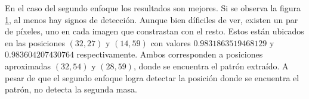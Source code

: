 \begin{figure}
	\caption{} \label{fig:example-mm-approach2}
\end{figure}

En el caso del segundo enfoque  los resultados son mejores. Si se observa la figura \ref{fig:example-mm-approach2}, al menos hay signos de detección.
Aunque bien díficiles de ver, existen un par de píxeles, uno en cada imagen que constrastan con el resto.
Estos están ubicados en las posiciones $(32,27)$ y $(14,59)$ con valores $0.9831863519468129$ y $0.983604207430764$
respectivamente. Ambos corresponden a posiciones aproximadas $(32,54)$ y $(28,59)$, donde se encuentra el patrón extraído.
A pesar de que el segundo enfoque logra detectar la posición donde se encuentra el patrón, no detecta la segunda masa.

